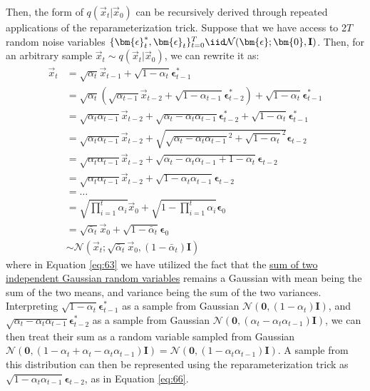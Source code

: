 Then, the form of $q(\vec{x}_t|\vec{x}_0)$ can be recursively derived through repeated applications of the reparameterization trick.
Suppose that we have access to 2$T$ random noise variables $\{\bm{\epsilon}_t^*,\bm{\epsilon}_t\}_{t=0}^T \iid \mathcal{N}(\bm{\epsilon}; \bm{0},\textbf{I})$.  Then, for an arbitrary sample $\vec{x}_t \sim q(\vec{x}_t|\vec{x}_0)$, we can rewrite it as:
\begingroup
\begin{align}
\vec{x}_t  &= \sqrt{\alpha_t}\vec{x}_{t-1} + \sqrt{1 - \alpha_t}\bm{\epsilon}_{t-1}^*\\
&= \sqrt{\alpha_t}\left(\sqrt{\alpha_{t-1}}\vec{x}_{t-2} + \sqrt{1 - \alpha_{t-1}}\bm{\epsilon}_{t-2}^*\right) + \sqrt{1 - \alpha_t}\bm{\epsilon}_{t-1}^*\\
&= \sqrt{\alpha_t\alpha_{t-1}}\vec{x}_{t-2} + \sqrt{\alpha_t - \alpha_t\alpha_{t-1}}\bm{\epsilon}_{t-2}^* + \sqrt{1 - \alpha_t}\bm{\epsilon}_{t-1}^*\\
&= \sqrt{\alpha_t\alpha_{t-1}}\vec{x}_{t-2} + \sqrt{\sqrt{\alpha_t - \alpha_t\alpha_{t-1}}^2 + \sqrt{1 - \alpha_t}^2}\bm{\epsilon}_{t-2} \label{eq:63}\\
&= \sqrt{\alpha_t\alpha_{t-1}}\vec{x}_{t-2} + \sqrt{\alpha_t - \alpha_t\alpha_{t-1} + 1 - \alpha_t}\bm{\epsilon}_{t-2}\\
&= \sqrt{\alpha_t\alpha_{t-1}}\vec{x}_{t-2} + \sqrt{1 - \alpha_t\alpha_{t-1}}\bm{\epsilon}_{t-2} \label{eq:66}\\
&= \ldots\\
&= \sqrt{\prod_{i=1}^t\alpha_i}\vec{x}_0 + \sqrt{1 - \prod_{i=1}^t\alpha_i}\bm{\bm{\epsilon}}_0\\
&= \sqrt{\bar\alpha_t}\vec{x}_0 + \sqrt{1 - \bar\alpha_t}\bm{\bm{\epsilon}}_0 \label{eq:68}\\
&\sim \mathcal{N}(\vec{x}_{t} ; \sqrt{\bar\alpha_t}\vec{x}_0, \left(1 - \bar\alpha_t\right)\textbf{I}) \label{eq:61}
\end{align}
where in Equation \ref{eq:63} we have utilized the fact that the \href{https://en.wikipedia.org/wiki/Sum_of_normally_distributed_random_variables}{sum of two independent Gaussian random variables} remains a Gaussian with mean being the sum of the two means, and variance being the sum of the two variances.  Interpreting $\sqrt{1 - \alpha_t}\bm{\epsilon}_{t-1}^*$ as a sample from Gaussian $\mathcal{N}(\bm{0}, (1 - \alpha_t)\textbf{I})$, and $\sqrt{\alpha_t - \alpha_t\alpha_{t-1}}\bm{\epsilon}_{t-2}^*$ as a sample from Gaussian $\mathcal{N}(\bm{0}, (\alpha_t - \alpha_t\alpha_{t-1})\textbf{I})$, we can then treat their sum as a random variable sampled from Gaussian $\mathcal{N}(\bm{0}, (1 - \alpha_t + \alpha_t - \alpha_t\alpha_{t-1})\textbf{I}) = \mathcal{N}(\bm{0}, (1 - \alpha_t\alpha_{t-1})\textbf{I})$.  A sample from this distribution can then be represented using the reparameterization trick as $\sqrt{1 - \alpha_t\alpha_{t-1}}\bm{\epsilon}_{t-2}$, as in Equation \ref{eq:66}.

